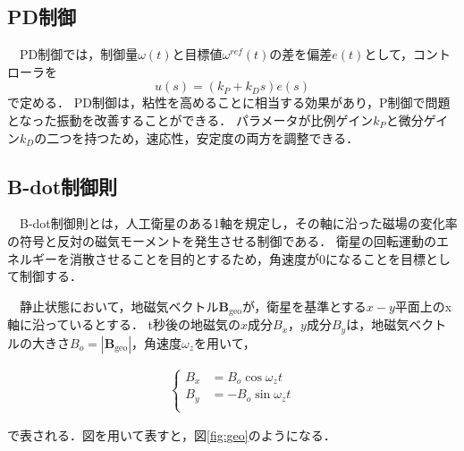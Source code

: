 \subsection{PD制御}

　PD制御では，制御量$\omega(t)$と目標値$\omega^{ref}(t)$の差を偏差$e(t)$として，コントローラを
\begin{equation}
    u(s) = (k_P+k_Ds)e(s)
\end{equation}
で定める．
PD制御は，粘性を高めることに相当する効果があり，P制御で問題となった振動を改善することができる．
パラメータが比例ゲイン$k_P$と微分ゲイン$k_D$の二つを持つため，速応性，安定度の両方を調整できる\cite{kawata}． 

\subsection{B-dot制御則}
　B-dot制御則とは，人工衛星のある1軸を規定し，その軸に沿った磁場の変化率の符号と反対の磁気モーメントを発生させる制御である．
衛星の回転運動のエネルギーを消散させることを目的とするため，角速度が0になることを目標として制御する\cite{bdot}．

　静止状態において，地磁気ベクトル$\boldsymbol{B}_\mathrm{geo}$が，衛星を基準とする$x-y$平面上のx軸に沿っているとする．
t秒後の地磁気の$x$成分$B_x$，$y$成分$B_y$は，地磁気ベクトルの大きさ$B_o=|\boldsymbol{B}_\mathrm{geo}|$，角速度$\omega_z$を用いて，

\begin{align}
    \left\{
        \begin{aligned}
            B_x &= B_o\cos\omega_zt\\
            B_y &= -B_o\sin\omega_zt\\
        \end{aligned}                    
    \right.
\end{align}

で表される．図を用いて表すと，図\ref{fig:geo}のようになる．

